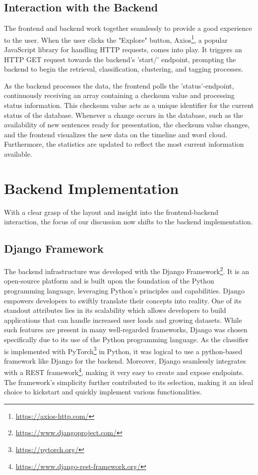 \documentclass[12pt,oneside,bibtotoc,liststotoc]{scrbook}
\begin{document}
\subsection{Interaction with the Backend}
The frontend and backend work together seamlessly to provide a good experience to the user. When the user clicks the "Explore" button, Axios\footnote{\url{https://axios-http.com/}}, a popular JavaScript library for handling HTTP requests, comes into play. It triggers an HTTP GET request towards the backend's 'start/' endpoint, prompting the backend to begin the retrieval, classification, clustering, and tagging processes.

As the backend processes the data, the frontend polls the 'status'-endpoint, continuously receiving an array containing a checksum value and processing status information. This checksum value acts as a unique identifier for the current status of the database. Whenever a change occurs in the database, such as the availability of new sentences ready for presentation, the checksum value changes, and the frontend visualizes the new data on the timeline and word cloud. Furthermore, the statistics are updated to reflect the most current information available.


\section{Backend Implementation}
With a clear grasp of the layout and insight into the frontend-backend interaction, the focus of our discussion now shifts to the backend implementation.

\subsection{Django Framework}
The backend infrastructure was developed with the Django Framework\footnote{\url{https://www.djangoproject.com/}}. It is an open-source platform and is built upon the foundation of the Python programming language, leveraging Python's principles and capabilities. Django empowers developers to swiftly translate their concepts into reality. One of its standout attributes lies in its scalability which allows developers to build applications that can handle increased user loads and growing datasets. While such features are present in many well-regarded frameworks, Django was chosen specifically due to its use of the Python programming language. As the classifier is implemented with PyTorch\footnote{\url{https://pytorch.org/}} in Python, it was logical to use a python-based framework like Django for the backend. Moreover, Django seamlessly integrates with a REST framework\footnote{\url{https://www.django-rest-framework.org/}}, making it very easy to create and expose endpoints. The framework's simplicity further contributed to its selection, making it an ideal choice to kickstart and quickly implement various functionalities.
\end{document}
